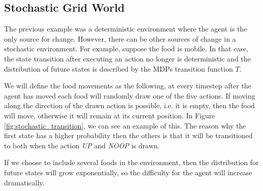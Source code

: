 \documentclass[12pt,A4]{report}
\theoremstyle{definition}
\begin{document}
\subsection{Stochastic Grid World}
The previous example was a deterministic environment where the agent is the only source for change. However, there can be other sources of change in a stochastic environment. For example, suppose the food is mobile. In that case, the state transition after executing an action no longer is deterministic and the distribution of future states is described by the MDPs transition function $T$.

We will define the food movements as the following, at every timestep after the agent has moved each food will randomly draw one of the five actions. If moving along the direction of the drawn action is possible, i.e. it is empty, then the food will move, otherwise it will remain at its current position. In Figure \ref{fig:stochastic_transition}, we can see an example of this. The reason why the first state has a higher probability then the others is that it will be transitioned to both when the action \textit{UP} and \textit{NOOP} is drawn. 

If we choose to include several foods in the environment, then the distribution for future states will grow exponentially, so the difficulty for the agent will increase dramatically. 
\end{document}
